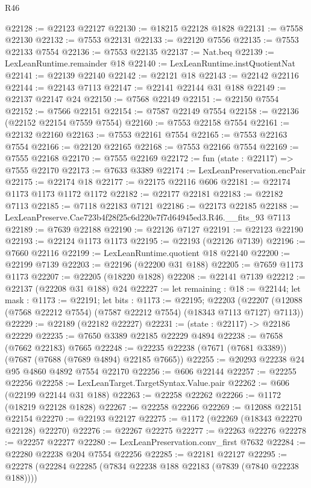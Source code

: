 \begin{lexlean}{R46}
\begin{coremodule}
@22128 := @22123 @22127
@22130 := @18215 @22128 @1828
@22131 := @7558 @22130
@22132 := @7553 @22131
@22133 := @22120 @7556
@22135 := @7553 @22133 @7554
@22136 := @7553 @22135
@22137 := Nat.beq
@22139 := LexLeanRuntime.remainder @18
@22140 := LexLeanRuntime.instQuotientNat
@22141 := @22139 @22140
@22142 := @22121 @18
@22143 := @22142 @22116
@22144 := @22143 @7113
@22147 := @22141 @22144 @31 @188
@22149 := @22137 @22147 @24
@22150 := @7568 @22149
@22151 := @22150 @7554
@22152 := @7566 @22151
@22154 := @7587 @22149 @7554
@22158 := @22136 (@22152 @22154 @7559 @7554)
@22160 := @7553 @22158 @7554
@22161 := @22132 @22160
@22163 := @7553 @22161 @7554
@22165 := @7553 @22163 @7554
@22166 := @22120 @22165
@22168 := @7553 @22166 @7554
@22169 := @7555 @22168
@22170 := @7555 @22169
@22172 := fun (state : @22117) => @7555 @22170
@22173 := @7633 @3389
@22174 := LexLeanPreservation.encPair
@22175 := @22174 @18
@22177 := @22175 @22116 @606
@22181 := @22174 @1173 @1173 @1172 @1172
@22182 := @22177 @22181
@22183 := @22182 @7113
@22185 := @7118 @22183 @7121
@22186 := @22173 @22185
@22188 := LexLeanPreserve.Cae723b4f28f25c6d220e7f7d64945ed3.R46.__fits_93 @7113
@22189 := @7639 @22188
@22190 := @22126 @7127
@22191 := @22123 @22190
@22193 := @22124 @1173 @1173
@22195 := @22193 (@22126 @7139)
@22196 := @7660 @22116
@22199 := LexLeanRuntime.quotient @18 @22140
@22200 := @22199 @7139
@22203 := @22196 (@22200 @31 @188)
@22205 := @7659 @1173 @1173
@22207 := @22205 (@18220 @1828)
@22208 := @22141 @7139
@22212 := @22137 (@22208 @31 @188) @24
@22227 := let remaining : @18 := @22144;
  let mask : @1173 := @22191;
  let bits : @1173 := @22195;
  @22203 (@22207 (@12088 (@7568 @22212 @7554) (@7587 @22212 @7554) (@18343 @7113 @7127) @7113))
@22229 := @22189 (@22182 @22227)
@22231 := (state : @22117) -> @22186 @22229
@22235 := @7650 @3389 @22185 @22229 @4894
@22238 := @7658 (@7662 @22183) @7665
@22248 := @22235 @22238 (@7671 (@7681 @3389)) (@7687 (@7688 (@7689 @4894) @22185 @7665))
@22255 := @20293 @22238 @24 @95 @4860 @4892 @7554 @22170
@22256 := @606 @22144
@22257 := @22255 @22256
@22258 := LexLeanTarget.TargetSyntax.Value.pair
@22262 := @606 (@22199 @22144 @31 @188)
@22263 := @22258 @22262
@22266 := @1172 (@18219 @22128 @1828)
@22267 := @22258 @22266
@22269 := @12088 @22151 @22154
@22270 := @22193 @22127
@22275 := @1172 (@22269 (@18343 @22270 @22128) @22270)
@22276 := @22267 @22275
@22277 := @22263 @22276
@22278 := @22257 @22277
@22280 := LexLeanPreservation.conv_first @7632
@22284 := @22280 @22238 @204 @7554 @22256
@22285 := @22181 @22127
@22295 := @22278 (@22284 @22285 (@7834 @22238 @188 @22183 (@7839 (@7840 @22238 @188))))

\end{coremodule}
\end{lexlean}
